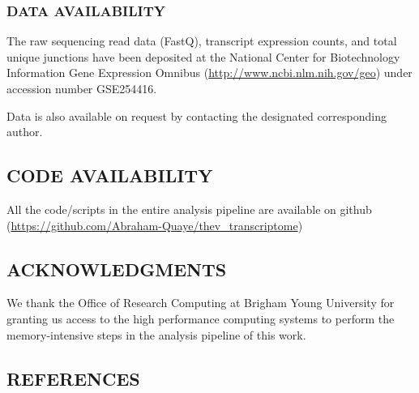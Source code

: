 \documentclass[
]{article}
\begin{document}
\subsubsection{DATA AVAILABILITY}\label{data-availability}

The raw sequencing read data (FastQ), transcript expression counts, and
total unique junctions have been deposited at the National Center for
Biotechnology Information Gene Expression Omnibus
(\url{http://www.ncbi.nlm.nih.gov/geo}) under accession number
GSE254416.

Data is also available on request by contacting the designated
corresponding author.

\subsection{CODE AVAILABILITY}\label{code-availability}

All the code/scripts in the entire analysis pipeline are available on
github (\url{https://github.com/Abraham-Quaye/thev_transcriptome})

\subsection{ACKNOWLEDGMENTS}\label{acknowledgments}

We thank the Office of Research Computing at Brigham Young University
for granting us access to the high performance computing systems to
perform the memory-intensive steps in the analysis pipeline of this
work. \newpage

\subsection{REFERENCES}\label{references}

\setlength{\parindent}{-0.25in}
\setlength{\leftskip}{0.25in}

\noindent
\end{document}

